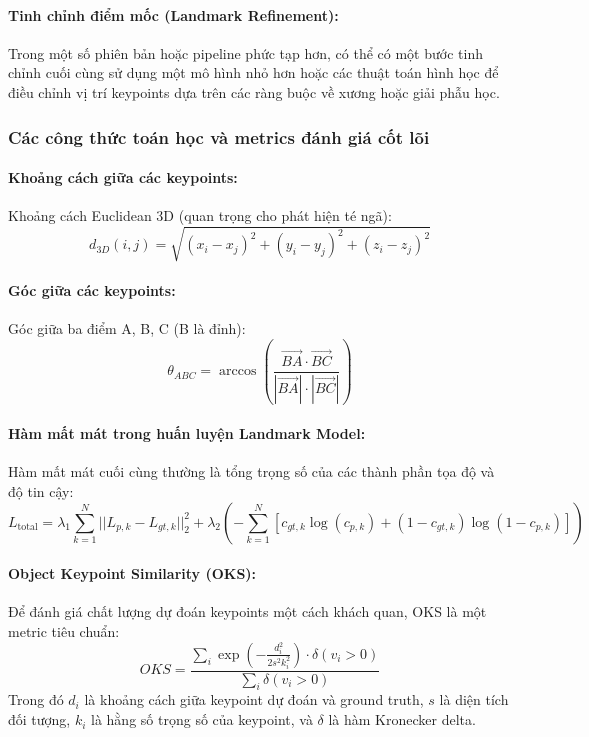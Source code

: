 \paragraph{Tinh chỉnh điểm mốc (Landmark Refinement):}
Trong một số phiên bản hoặc pipeline phức tạp hơn, có thể có một bước tinh chỉnh cuối cùng sử dụng một mô hình nhỏ hơn hoặc các thuật toán hình học để điều chỉnh vị trí keypoints dựa trên các ràng buộc về xương hoặc giải phẫu học.

\subsubsection{Các công thức toán học và metrics đánh giá cốt lõi}

\paragraph{Khoảng cách giữa các keypoints:}
Khoảng cách Euclidean 3D (quan trọng cho phát hiện té ngã):
\begin{equation}
d_{3D}(i,j) = \sqrt{(x_i - x_j)^2 + (y_i - y_j)^2 + (z_i - z_j)^2}
\end{equation}

\paragraph{Góc giữa các keypoints:}
Góc giữa ba điểm A, B, C (B là đỉnh):
\begin{equation}
\theta_{ABC} = \arccos\left(\frac{\vec{BA} \cdot \vec{BC}}{|\vec{BA}| \cdot |\vec{BC}|}\right)
\end{equation}

\paragraph{Hàm mất mát trong huấn luyện Landmark Model:}
Hàm mất mát cuối cùng thường là tổng trọng số của các thành phần tọa độ và độ tin cậy:
\begin{equation}
L_{\text{total}} = \lambda_1 \sum_{k=1}^{N} ||L_{p,k} - L_{gt,k}||_2^2 + \lambda_2 \left(-\sum_{k=1}^{N} [c_{gt,k} \log(c_{p,k}) + (1-c_{gt,k}) \log(1-c_{p,k})]\right)
\end{equation}

\paragraph{Object Keypoint Similarity (OKS):}
Để đánh giá chất lượng dự đoán keypoints một cách khách quan, OKS là một metric tiêu chuẩn:
\begin{equation}
OKS = \frac{\sum_i \exp\left(-\frac{d_i^2}{2s^2k_i^2}\right) \cdot \delta(v_i > 0)}{\sum_i \delta(v_i > 0)}
\end{equation}
Trong đó $d_i$ là khoảng cách giữa keypoint dự đoán và ground truth, $s$ là diện tích đối tượng, $k_i$ là hằng số trọng số của keypoint, và $\delta$ là hàm Kronecker delta.

